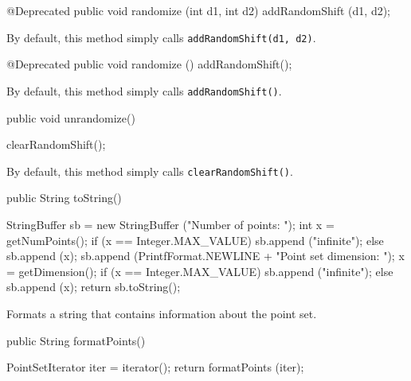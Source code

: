 \begin{hide}\begin{code}

   @Deprecated
   public void randomize (int d1, int d2) {
      addRandomShift (d1, d2);
  }
\end{code}
\begin{tabb} By default, this method simply calls \texttt{addRandomShift(d1, d2)}.
\end{tabb}
\begin{code}

   @Deprecated
   public void randomize () {
      addRandomShift();
   }
\end{code}
\begin{tabb} By default, this method simply calls \texttt{addRandomShift()}.
\end{tabb}
\end{hide}\begin{code}

   public void unrandomize()\begin{hide} {
      clearRandomShift();
  }\end{hide}
\end{code}
\begin{tabb} By default, this method simply calls
   \texttt{clearRandomShift()}.
\end{tabb}
\begin{code}

   public String toString() \begin{hide} {
       StringBuffer sb = new StringBuffer ("Number of points: ");
       int x = getNumPoints();
       if (x == Integer.MAX_VALUE)
          sb.append ("infinite");
       else
          sb.append (x);
       sb.append (PrintfFormat.NEWLINE + "Point set dimension: ");
       x = getDimension();
       if (x == Integer.MAX_VALUE)
          sb.append ("infinite");
       else
          sb.append (x);
       return sb.toString();
   }\end{hide}
\end{code}
\begin{tabb}
   Formats a string that contains information about the point set.
\end{tabb}
\begin{htmlonly}
\end{htmlonly}
\begin{code}

   public String formatPoints() \begin{hide} {
      PointSetIterator iter = iterator();
      return formatPoints (iter);
   }\end{hide}
\end{code}
